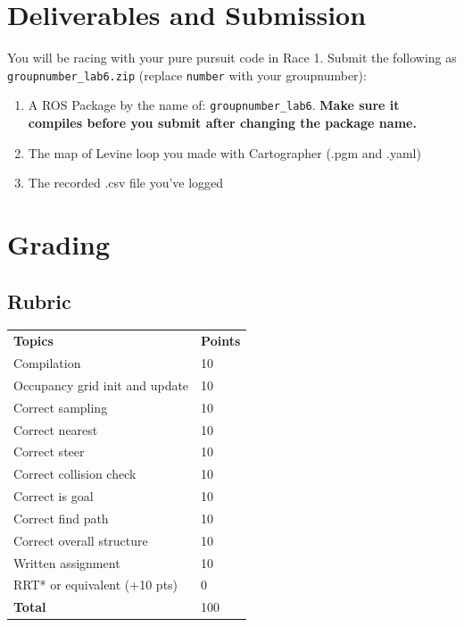 \documentclass[letta4 paper]{article}
\numberwithin{equation}{section}
\newcommand{\0}{\mathbf{0}}
\begin{document}
	\section{Deliverables and Submission}
	You will be racing with your pure pursuit code in Race 1.
	Submit the following as \texttt{groupnumber\_lab6.zip} (replace \texttt{number} with your groupnumber):
	

	\begin{enumerate}
		\item A ROS Package by the name of: \texttt{groupnumber\_lab6}. \textbf{Make sure it compiles before you submit after changing the package name.}
		\item The map of Levine loop you made with Cartographer (.pgm and .yaml)
		\item The recorded .csv file you’ve logged
	\end{enumerate}

	\section{Grading}
	
	\subsection{Rubric}
	\begin{table}[h]
		\begin{tabular}{ll}
			\textbf{Topics} & \textbf{Points} \\
				Compilation	& 10 \\
				Occupancy grid init and update &	10 \\
				Correct sampling &	10 \\
				Correct nearest	& 10 \\
				Correct steer &	10 \\
				Correct collision check &	10 \\
				Correct is goal	& 10 \\
				Correct find path &	10 \\
				Correct overall structure &	10 \\
				Written assignment &	10 \\
				RRT* or equivalent (+10 pts) &	0 \\
			\textbf{Total} & 100 \\
		\end{tabular}
	\end{table}
	

	
			
\end{document}
